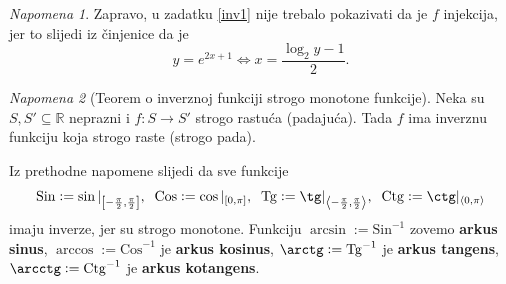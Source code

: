 \documentclass{book}
\let\originalleft\left
\let\originalright\right
\renewcommand{\left}{\mathopen{}\mathclose\bgroup\originalleft}
\renewcommand{\right}{\aftergroup\egroup\originalright}
\theoremstyle{definition}
\theoremstyle{definition}
\theoremstyle{remark}
\newtheorem{remark}{Napomena}
\begin{document}
\begin{remark}
Zapravo, u zadatku \ref{inv1} nije trebalo pokazivati da je $f$ injekcija, jer to slijedi iz činjenice da je
$$y=e^{2x+1}\Leftrightarrow x=\dfrac{\log_2{y}-1}{2}.$$
\end{remark}
\begin{remark}[Teorem o inverznoj funkciji strogo monotone funkcije]
Neka su $S, S'\subseteq \mathbb{R}$ neprazni i $f : S\to S'$ strogo rastuća (padajuća). Tada $f$ ima inverznu funkciju koja strogo raste (strogo pada).
\end{remark}
Iz prethodne napomene slijedi da sve funkcije $$\mathrm{Sin}:=\sin|_{\left[-\frac{\pi}{2},\frac{\pi}{2}\right]},\;\;\mathrm{Cos}:=\cos|_{\left[0, \pi\right]},\;\;\mathrm{Tg}:=\tg|_{\left\langle-\frac{\pi}{2},\frac{\pi}{2}\right\rangle},\;\;\mathrm{Ctg}:=\ctg|_{\left\langle 0, \pi\right\rangle}$$
imaju inverze, jer su strogo monotone. Funkciju $\arcsin:=\mathrm{Sin}^{-1}$ zovemo \textbf{arkus sinus}, $\arccos:=\mathrm{Cos}^{-1}$ je \textbf{arkus kosinus}, $\arctg:=\mathrm{Tg}^{-1}$ je \textbf{arkus tangens}, $\arcctg:=\mathrm{Ctg}^{-1}$ je \textbf{arkus kotangens}.
\end{document}

